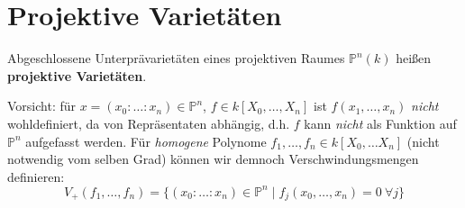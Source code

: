 
\section{Projektive Varietäten}
\label{sec:projektive-varietaeten}
\begin{defn}[orig. 54]
  \label{def:projektive-varietaeten}
  Abgeschlossene Unterprävarietäten eines projektiven Raumes $\mathbb{P}^{n}(k)$
  heißen \textbf{projektive Varietäten}.
\end{defn}
Vorsicht: für $x=(x_{0}:\ldots:x_{n})\in\mathbb{P}^{n}$, $f\in k[X_{0},\ldots,X_{n}]$
ist $f(x_{1},\ldots,x_{n})$ \emph{nicht} wohldefiniert, da von Repräsentaten
abhängig, d.h. $f$ kann \emph{nicht}\textbf{ }als Funktion auf $\mathbb{P}^{n}$
aufgefasst werden. Für \emph{homogene}\textbf{ }Polynome $f_{1},\ldots,f_{n}\in k[X_{0},\ldots X_{n}]$
(nicht notwendig vom selben Grad) können wir demnoch Verschwindungsmengen
definieren:
\[
  V_{+}(f_{1},\ldots,f_{n})=\{(x_{0}:\ldots:x_{n})\in\mathbb{P}^{n}\mid f_{j}(x_{0},\ldots,x_{n})=0\ \forall j\}
\]

